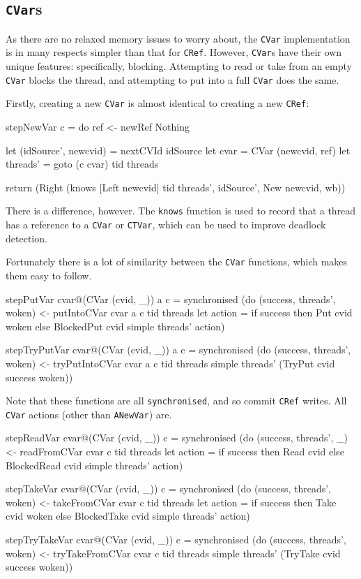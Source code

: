 \subsection{\texttt{CVar}s}
\label{sec:execution-stepwise-cvar}

As there are no relaxed memory issues to worry about, the \verb|CVar|
implementation is in many respects simpler than that for
\verb|CRef|. However, \verb|CVar|s have their own unique features:
specifically, blocking. Attempting to read or take from an empty
\verb|CVar| blocks the thread, and attempting to put into a full
\verb|CVar| does the same.

Firstly, creating a new \verb|CVar| is almost identical to creating a
new \verb|CRef|:

\begin{haskellcode}
stepNewVar c = do
  ref <- newRef Nothing

  let (idSource', newcvid) = nextCVId idSource
  let cvar = CVar (newcvid, ref)
  let threads' = goto (c cvar) tid threads

  return (Right
    (knows [Left newcvid] tid threads', idSource', New newcvid, wb))
\end{haskellcode}

There is a difference, however. The \verb|knows| function is used to
record that a thread has a reference to a \verb|CVar| or \verb|CTVar|,
which can be used to improve deadlock detection.

Fortunately there is a lot of similarity between the \verb|CVar|
functions, which makes them easy to follow.

\begin{haskellcode}
stepPutVar cvar@(CVar (cvid, _)) a c = synchronised (do
  (success, threads', woken) <- putIntoCVar cvar a c tid threads
  let action = if success then Put cvid woken else BlockedPut cvid
  simple threads' action)

stepTryPutVar cvar@(CVar (cvid, _)) a c = synchronised (do
  (success, threads', woken) <- tryPutIntoCVar cvar a c tid threads
  simple threads' (TryPut cvid success woken))
\end{haskellcode}

Note that these functions are all \verb|synchronised|, and so commit
\verb|CRef| writes. All \verb|CVar| actions (other than
\verb|ANewVar|) are.

\begin{haskellcode}
stepReadVar cvar@(CVar (cvid, _)) c = synchronised (do
  (success, threads', _) <- readFromCVar cvar c tid threads
  let action = if success then Read cvid else BlockedRead cvid
  simple threads' action)

stepTakeVar cvar@(CVar (cvid, _)) c = synchronised (do
  (success, threads', woken) <- takeFromCVar cvar c tid threads
  let action = if success then Take cvid woken else BlockedTake cvid
  simple threads' action)

stepTryTakeVar cvar@(CVar (cvid, _)) c = synchronised (do
  (success, threads', woken) <- tryTakeFromCVar cvar c tid threads
  simple threads' (TryTake cvid success woken))
\end{haskellcode}


